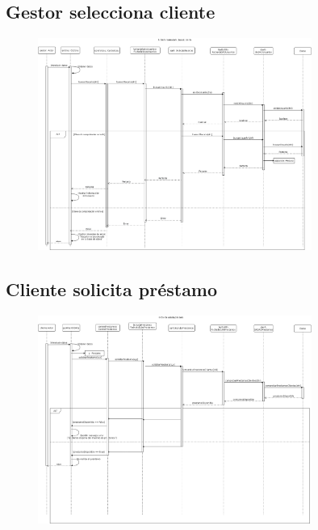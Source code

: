 \documentclass[12pt]{article}
\begin{document}
\subsection{Gestor selecciona cliente}
\begin{figure}[H]
    \centering
    \includegraphics[width=0.8\textwidth]{images/gestor_selecciona_cliente_consultar_5.png}
\end{figure}

\subsection{Cliente solicita préstamo}
\begin{figure}[H]
    \centering
    \includegraphics[width=0.8\textwidth]{images/ClienteSolicitaPrestamo2.png}
\end{figure}
\end{document}
